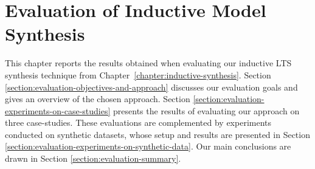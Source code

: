 \chapter{Evaluation of Inductive Model Synthesis\label{chapter:evaluation}}

This chapter reports the results obtained when evaluating our inductive LTS synthesis technique from Chapter~\ref{chapter:inductive-synthesis}. Section \ref{section:evaluation-objectives-and-approach} discusses our evaluation goals and gives an overview of the chosen approach. Section \ref{section:evaluation-experiments-on-case-studies} presents the results of evaluating our approach on three case-studies. These evaluations are complemented by experiments conducted on synthetic datasets, whose setup and results are presented in Section \ref{section:evaluation-experiments-on-synthetic-data}. Our main conclusions are drawn in Section \ref{section:evaluation-summary}.





